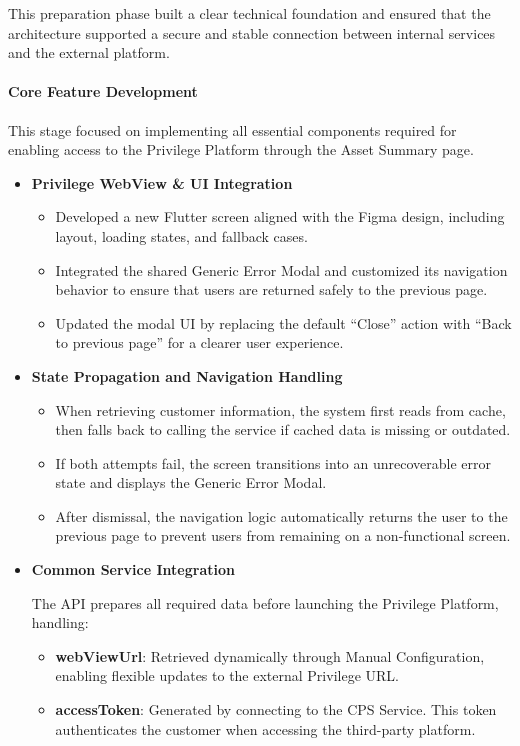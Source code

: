 \documentclass[12pt,oneside,openright,a4paper]{cpe-english-project}
\begin{document}
This preparation phase built a clear technical foundation and ensured
that the architecture supported a secure and stable connection between
internal services and the external platform.

\paragraph{Core Feature Development}

This stage focused on implementing all essential components required for
enabling access to the Privilege Platform through the Asset Summary
page.

\begin{itemize}
\item \textbf{Privilege WebView \& UI Integration}
  \begin{itemize}
  \item
    Developed a new Flutter screen aligned with the Figma design,
    including layout, loading states, and fallback cases.
  \item
    Integrated the shared Generic Error Modal and customized its
    navigation behavior to ensure that users are returned safely to the
    previous page.
  \item
    Updated the modal UI by replacing the default ``Close'' action with
    ``Back to previous page'' for a clearer user experience.
  \end{itemize}

\item \textbf{State Propagation and Navigation Handling}
  \begin{itemize}
  \item
    When retrieving customer information, the system first reads from
    cache, then falls back to calling the service if cached data is
    missing or outdated.
  \item
    If both attempts fail, the screen transitions into an unrecoverable
    error state and displays the Generic Error Modal.
  \item
    After dismissal, the navigation logic automatically returns the user
    to the previous page to prevent users from remaining on a
    non-functional screen.
  \end{itemize}

\item \textbf{Common Service Integration}
  
  The API prepares all required data before launching the Privilege Platform, handling:
  \begin{itemize}
  \item \textbf{webViewUrl}: Retrieved dynamically through Manual Configuration, enabling flexible updates to the external Privilege URL.
  \item \textbf{accessToken}: Generated by connecting to the CPS Service. This token authenticates the customer when accessing the third-party platform.
  \end{itemize}


\end{itemize}
\end{document}
